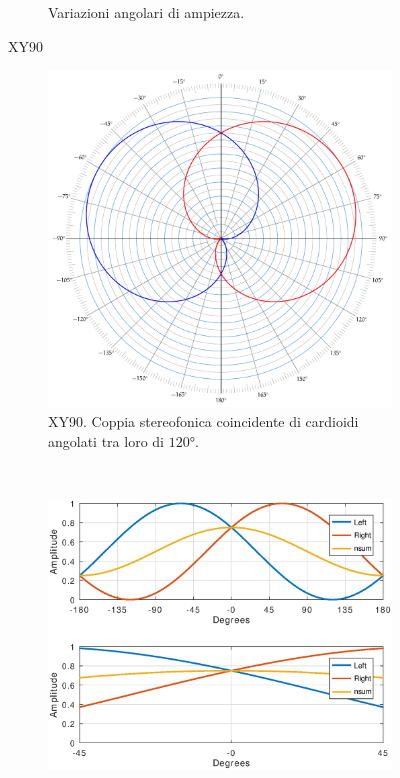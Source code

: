 \begin{figure}[t]
\begin{subfigure}[t]{0.99\textwidth}
        \caption{Variazioni angolari di ampiezza.}%
        \label{plot:xy90}
    \end{subfigure}
    \caption{XY90}
    \label{sp:xy90}
\end{figure}

\clearpage

\begin{figure}[t]
    \centering
    \begin{subfigure}[t]{0.99\textwidth}
        \centering
        \includegraphics[width=11cm]{CAPITOLI/_TIKZ/POLAR/xy120}
        \caption{XY90. Coppia stereofonica coincidente di cardioidi angolati tra loro di $120°$.}%
        \label{pol:xy120sp}
    \end{subfigure}%
    \\
    \begin{subfigure}[t]{0.99\textwidth}
        \centering
        \includegraphics[width=12.5cm]{CAPITOLI/1000/IMG/xy120sub}

\end{subfigure}
\end{figure}
